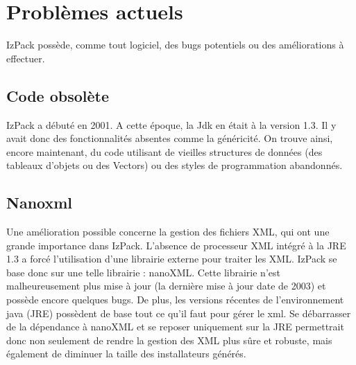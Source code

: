 \section{Problèmes actuels}
IzPack possède, comme tout logiciel, des bugs potentiels ou des améliorations à effectuer.
\subsection{Code obsolète}
IzPack a débuté en 2001.
A cette époque, la Jdk en était à la version 1.3. Il y avait donc des fonctionnalités absentes comme la généricité.
On trouve ainsi, encore maintenant, du code utilisant de vieilles structures de données (des tableaux d'objets ou des Vectors) ou des styles de programmation abandonnés.
\subsection{Nanoxml}
Une amélioration possible concerne la gestion des fichiers XML, qui ont une grande importance dans IzPack.
L'absence de processeur XML intégré à la JRE 1.3 a forcé l'utilisation d'une librairie externe pour traiter les XML.
IzPack se base donc sur une telle librairie : nanoXML.
Cette librairie n'est malheureusement plus mise à jour (la dernière mise à jour date de 2003) et possède encore quelques bugs.
De plus, les versions récentes de l'environnement java (JRE) possèdent de base tout ce qu'il faut pour gérer le xml.
Se débarrasser de la dépendance à nanoXML et se reposer uniquement sur la JRE permettrait donc non seulement de rendre la gestion des XML plus sûre et robuste, mais également de diminuer la taille des installateurs générés.